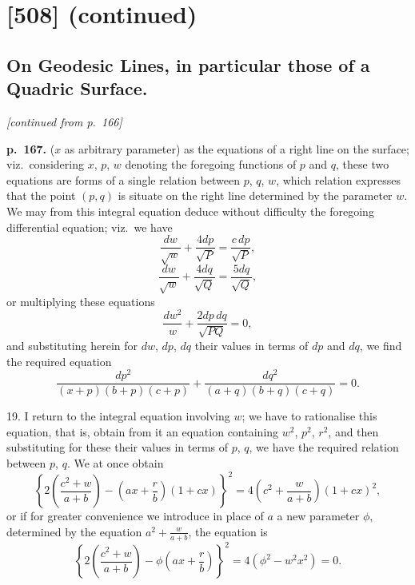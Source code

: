 \documentclass[11pt,a4paper]{article}
\begin{document}
\section*{[508] (continued)}
\subsection*{On Geodesic Lines, in particular those of a Quadric Surface.}

\begin{center}
\textit{[continued from p.~166]}
\end{center}

\noindent
\textbf{p.~167.} ($x$ as arbitrary parameter) as the equations of a right line on the surface;
viz.\ considering $x$, $p$, $w$ denoting the foregoing functions of $p$ and $q$, these two equations
are forms of a single relation between $p$, $q$, $w$, which relation expresses that the point
$(p, q)$ is situate on the right line determined by the parameter $w$.  We may from
this integral equation deduce without difficulty the foregoing differential equation;
viz.\ we have
\[
\frac{dw}{\sqrt{w}} + \frac{4 dp}{\sqrt{P}} = \frac{c \, dp}{\sqrt{P}},
\]
\[
\frac{dw}{\sqrt{w}} + \frac{4 dq}{\sqrt{Q}} = \frac{5 dq}{\sqrt{Q}},
\]
or multiplying these equations
\[
\frac{dw^2}{w} + \frac{2 dp \, dq}{\sqrt{PQ}} = 0,
\]
and substituting herein for $dw$, $dp$, $dq$ their values in terms of $dp$ and $dq$, we find the required equation
\[
\frac{dp^2}{(x+p)(b+p)(c+p)} + \frac{dq^2}{(a+q)(b+q)(c+q)} = 0.
\]

19. I return to the integral equation involving $w$; we have to rationalise this
equation, that is, obtain from it an equation containing $w^2$, $p^2$, $r^2$, and then substituting
for these their values in terms of $p$, $q$, we have the required relation between $p$, $q$.
We at once obtain
\[
\left\{ 2 \left( \frac{c^2 + w}{a + b} \right) - \left( a x + \frac{r}{b} \right) (1 + c x) \right\}^2 = 4 \left( c^2 + \frac{w}{a+b} \right) (1 + c x)^2,
\]
or if for greater convenience we introduce in place of $a$ a new parameter $\phi$, determined by the equation $a^2 + \frac{w}{a+b}$, the equation is
\[
\left\{ 2 \left( \frac{c^2 + w}{a+b} \right) - \phi \left( a x + \frac{r}{b} \right) \right\}^2 = 4 (\phi^2 - w^2 x^2) = 0.
\]
\end{document}
